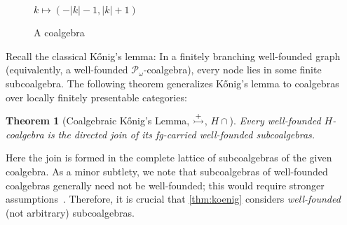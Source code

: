 \documentclass[10pt,a4paper]{article}
\newtheorem{theorem}{Theorem}[section]
\theoremstyle{definition}
\theoremstyle{remark}
\numberwithin{equation}{section}
\newcommand{\Konig}{Kőnig}
\newcommand{\lfplong}{locally finitely presentable\xspace}
\newcommand{\lfp}{\lfplong}
\newcommand{\Powf}{\mathcal{P}_{\omega}}
\newcommand{\ar}{\mathsf{ar}}
\newcommand{\pullbackangle}[2][]{\arrow[phantom,to path={
                     -- ($ (\tikztostart)!1cm!#2:([xshift=8cm]\tikztostart) $)
                        node[anchor=west,pos=0.0,rotate=#2,
                        inner xsep = 0]
                        {\begin{tikzpicture}[minimum
                        height=1mm,baseline=0,#1]
    \draw[-] (0,0) -- (.5em,.5em) -- (0,1em);
                        \end{tikzpicture}}}]{}}
\newcommand{\injmono}{\ensuremath{\overset{\smash{\raisebox{-1pt}{\ensuremath{\scriptstyle+}}}}{\rightarrowtail}}}\newcommand{\hpresint}{\ensuremath{H\cap}\xspace}
\theoremstyle{plain}
\theoremstyle{definition}
\begin{document}
\begin{figure}
\begin{minipage}[b]{.40\textwidth}
  \label{fig:joinSubcoalgebras}
  \end{minipage}  \begin{minipage}[b]{.30\textwidth}
  \caption{Cartesianess.}
  \label{fig:joinCartesian}
  \end{minipage}  \begin{minipage}[b]{.30\textwidth}
    \centering
    \\[2mm]
    $k \mapsto (-|k|{-}1, |k|{+}1)$
  \caption{A coalgebra}
  \label{fig:coalgExample}
  \end{minipage}\end{figure}

Recall the classical \Konig's lemma: In a finitely branching well-founded graph (equivalently, a well-founded $\Powf$-coalgebra), every node lies in some finite subcoalgebra. The following theorem generalizes \Konig's lemma to coalgebras over \lfp categories:


\begin{theorem}[Coalgebraic \Konig's Lemma, \injmono, \hpresint]\label{thm:koenig}
Every well-founded $H$-coalgebra is the directed join of its fg-carried well-founded subcoalgebras.
\end{theorem}

Here the join is formed in the complete lattice of subcoalgebras of the given coalgebra. As a minor subtlety, we note that subcoalgebras of well-founded coalgebras generally need not be well-founded; this would require stronger assumptions~\cite[Prop.~8.4.7]{amm25}. Therefore, it is crucial that \autoref{thm:koenig} considers \emph{well-founded} (not arbitrary) subcoalgebras. 
\end{document}
